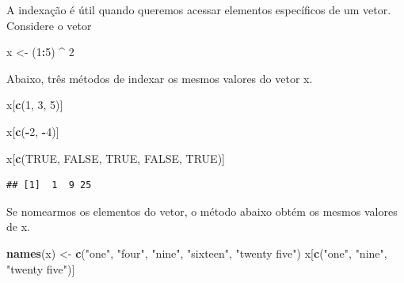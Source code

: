 \documentclass[
]{book}
\newenvironment{Shaded}{\begin{snugshade}}{\end{snugshade}}
\newcommand{\ConstantTok}[1]{\textcolor[rgb]{0.56,0.35,0.01}{#1}}
\newcommand{\DecValTok}[1]{\textcolor[rgb]{0.00,0.00,0.81}{#1}}
\newcommand{\FunctionTok}[1]{\textcolor[rgb]{0.13,0.29,0.53}{\textbf{#1}}}
\newcommand{\NormalTok}[1]{#1}
\newcommand{\OtherTok}[1]{\textcolor[rgb]{0.56,0.35,0.01}{#1}}
\newcommand{\SpecialCharTok}[1]{\textcolor[rgb]{0.81,0.36,0.00}{\textbf{#1}}}
\newcommand{\StringTok}[1]{\textcolor[rgb]{0.31,0.60,0.02}{#1}}
\begin{document}
A indexação é útil quando queremos acessar elementos específicos de um vetor.
Considere o vetor

\begin{Shaded}
\begin{Highlighting}[]
\NormalTok{x }\OtherTok{\textless{}{-}}\NormalTok{ (}\DecValTok{1}\SpecialCharTok{:}\DecValTok{5}\NormalTok{) }\SpecialCharTok{\^{}} \DecValTok{2}
\end{Highlighting}
\end{Shaded}

Abaixo, três métodos de indexar os mesmos valores do vetor x.

\begin{Shaded}
\begin{Highlighting}[]
\NormalTok{x[}\FunctionTok{c}\NormalTok{(}\DecValTok{1}\NormalTok{, }\DecValTok{3}\NormalTok{, }\DecValTok{5}\NormalTok{)]}

\NormalTok{x[}\FunctionTok{c}\NormalTok{(}\SpecialCharTok{{-}}\DecValTok{2}\NormalTok{, }\SpecialCharTok{{-}}\DecValTok{4}\NormalTok{)]}
\end{Highlighting}
\end{Shaded}

\begin{Shaded}
\begin{Highlighting}[]
\NormalTok{x[}\FunctionTok{c}\NormalTok{(}\ConstantTok{TRUE}\NormalTok{, }\ConstantTok{FALSE}\NormalTok{, }\ConstantTok{TRUE}\NormalTok{, }\ConstantTok{FALSE}\NormalTok{, }\ConstantTok{TRUE}\NormalTok{)]}
\end{Highlighting}
\end{Shaded}

\begin{verbatim}
## [1]  1  9 25
\end{verbatim}

Se nomearmos os elementos do vetor, o método abaixo obtém os mesmos valores de x.

\begin{Shaded}
\begin{Highlighting}[]
\FunctionTok{names}\NormalTok{(x) }\OtherTok{\textless{}{-}} \FunctionTok{c}\NormalTok{(}\StringTok{"one"}\NormalTok{, }\StringTok{"four"}\NormalTok{, }\StringTok{"nine"}\NormalTok{, }\StringTok{"sixteen"}\NormalTok{, }\StringTok{"twenty five"}\NormalTok{)}
\NormalTok{x[}\FunctionTok{c}\NormalTok{(}\StringTok{"one"}\NormalTok{, }\StringTok{"nine"}\NormalTok{, }\StringTok{"twenty five"}\NormalTok{)]}
\end{Highlighting}
\end{Shaded}
\end{document}
